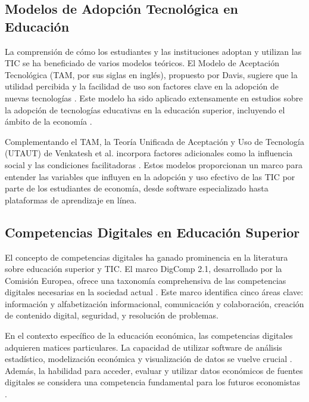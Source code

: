 \documentclass[12pt, a4paper]{article}
\begin{document}
\subsection{Modelos de Adopción Tecnológica en Educación}

La comprensión de cómo los estudiantes y las instituciones adoptan y utilizan las TIC se ha beneficiado de varios modelos teóricos. El Modelo de Aceptación Tecnológica (TAM, por sus siglas en inglés), propuesto por Davis, sugiere que la utilidad percibida y la facilidad de uso son factores clave en la adopción de nuevas tecnologías \parencite{Davis1989}. Este modelo ha sido aplicado extensamente en estudios sobre la adopción de tecnologías educativas en la educación superior, incluyendo el ámbito de la economía \parencite{Abdullah2016}.

Complementando el TAM, la Teoría Unificada de Aceptación y Uso de Tecnología (UTAUT) de Venkatesh et al. incorpora factores adicionales como la influencia social y las condiciones facilitadoras \parencite{Venkatesh2003}. Estos modelos proporcionan un marco para entender las variables que influyen en la adopción y uso efectivo de las TIC por parte de los estudiantes de economía, desde software especializado hasta plataformas de aprendizaje en línea.

\subsection{Competencias Digitales en Educación Superior}

El concepto de competencias digitales ha ganado prominencia en la literatura sobre educación superior y TIC. El marco DigComp 2.1, desarrollado por la Comisión Europea, ofrece una taxonomía comprehensiva de las competencias digitales necesarias en la sociedad actual \parencite{Carretero2017}. Este marco identifica cinco áreas clave: información y alfabetización informacional, comunicación y colaboración, creación de contenido digital, seguridad, y resolución de problemas.

En el contexto específico de la educación económica, las competencias digitales adquieren matices particulares. La capacidad de utilizar software de análisis estadístico, modelización económica y visualización de datos se vuelve crucial \parencite{Becker2019}. Además, la habilidad para acceder, evaluar y utilizar datos económicos de fuentes digitales se considera una competencia fundamental para los futuros economistas \parencite{Allgood2015}.
\end{document}

